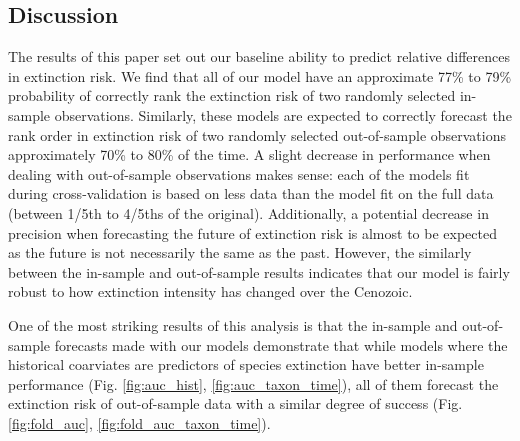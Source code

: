 \documentclass[12pt,letterpaper]{article}
\begin{document}
\begin{refsection}
%
%
%



\section{Discussion}

The results of this paper set out our baseline ability to predict relative differences in extinction risk. We find that all of our model have an approximate 77\% to 79\% probability of correctly rank the extinction risk of two randomly selected in-sample observations. Similarly, these models are expected to correctly forecast the rank order in extinction risk of two randomly selected out-of-sample observations approximately 70\% to 80\% of the time. A slight decrease in performance when dealing with out-of-sample observations makes sense: each of the models fit during cross-validation is based on less data than the model fit on the full data (between 1/5th to 4/5ths of the original). Additionally, a potential decrease in precision when forecasting the future of extinction risk is almost to be expected as the future is not necessarily the same as the past. However, the similarly between the in-sample and out-of-sample results indicates that our model is fairly robust to how extinction intensity has changed over the Cenozoic. 

One of the most striking results of this analysis is that the in-sample and out-of-sample forecasts made with our models demonstrate that while models where the historical coarviates are predictors of species extinction have better in-sample performance (Fig. \ref{fig:auc_hist}, \ref{fig:auc_taxon_time}), all of them forecast the extinction risk of out-of-sample data with a similar degree of success (Fig. \ref{fig:fold_auc}, \ref{fig:fold_auc_taxon_time}).


\end{refsection}
\end{document}
